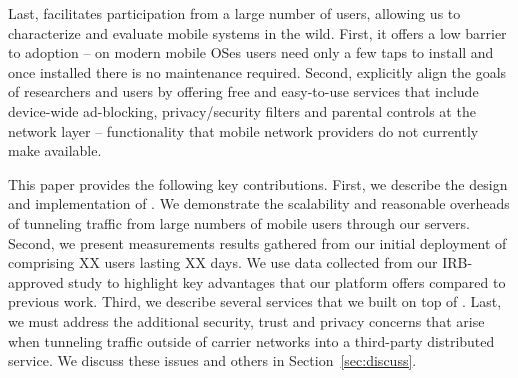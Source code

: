 Last, \meddle facilitates participation from a large number of users, allowing 
us to characterize and evaluate mobile systems in the wild. First, it offers a low barrier to adoption -- 
on modern mobile OSes users need only a few taps to install \meddle and 
once installed there is no maintenance required. Second, \meddle explicitly align the goals of researchers 
and users by offering free and easy-to-use services that include device-wide
ad-blocking, privacy/security filters and parental controls at the
network layer -- functionality that mobile network providers do not
currently make available. 

This paper provides the following key contributions. First, we describe the 
design and implementation of \meddle. We demonstrate the scalability and reasonable overheads of 
tunneling traffic from large numbers of mobile users through our servers. 
Second, we present measurements results gathered from our initial deployment of \meddle  
comprising XX users lasting XX days. We use data collected from 
our IRB-approved study to highlight key advantages that our platform 
offers compared to previous work. Third, we describe several 
services that we built on top of \meddle. Last, we must address the
additional security, trust and privacy concerns that arise when
tunneling traffic outside of carrier networks into a third-party
distributed service. We discuss these issues and others in
Section~\ref{sec:discuss}.



